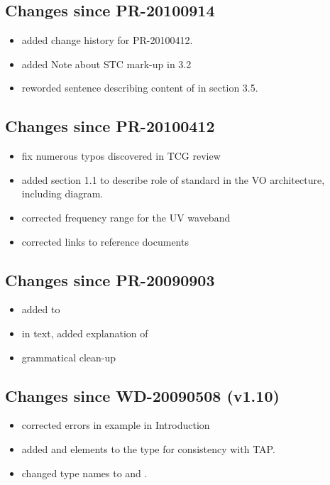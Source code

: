 \documentclass[11pt,a4paper]{ivoa}
\begin{document}
\subsection{Changes since PR-20100914}

\begin{itemize}
  \item added change history for PR-20100412.
  \item added Note about STC mark-up in 3.2
  \item reworded sentence describing content of  in
       section 3.5.
\end{itemize}

\subsection{Changes since PR-20100412}

\begin{itemize}
  \item fix numerous typos discovered in TCG review
  \item added section 1.1 to describe role of standard in the VO
       architecture, including diagram.
  \item corrected frequency range for the UV waveband
  \item corrected links to reference documents
\end{itemize}

\subsection{Changes since PR-20090903}

\begin{itemize}
  \item added 
       to 
  \item in text, added explanation of
  \item grammatical clean-up
\end{itemize}

\subsection{Changes since WD-20090508 (v1.10)}

\begin{itemize}
  \item corrected errors in example in Introduction
  \item added  and
        elements to the
        type for consistency with TAP.
  \item changed type names  to
        and 
       .
\end{itemize}
\end{document}
